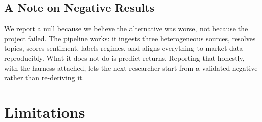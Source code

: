\documentclass[11pt]{article}
\begin{document}
\subsection{A Note on Negative Results}

We report a null because we believe the alternative was worse, not because the project failed. The pipeline works: it ingests three heterogeneous sources, resolves topics, scores sentiment, labels regimes, and aligns everything to market data reproducibly. What it does not do is predict returns. Reporting that honestly, with the harness attached, lets the next researcher start from a validated negative rather than re-deriving it.

\section{Limitations}
\label{sec:limitations}
\end{document}
